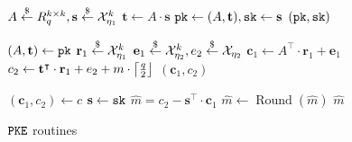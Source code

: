 \documentclass{article}
\begin{document}
\begin{figure}[H]
    \begin{minipage}{0.3\textwidth}
        \begin{algorithm}[H]
            \caption{$\keygen_\pke$}\label{alg:kyber-pke-keygen}
            \begin{algorithmic}[1]
                \State $A \stackrel{\$}{\leftarrow} R_q^{k \times k}
                    , \mathbf{s} \stackrel{\$}{\leftarrow} \mathcal{X}_{\eta_1}^k$
                \State $\mathbf{t} \leftarrow A \cdot \mathbf{s}$
                \State $\texttt{pk} \leftarrow (A, \mathbf{t}), \texttt{sk} \leftarrow \mathbf{s}$
                \State \Return $(\texttt{pk}, \texttt{sk})$
            \end{algorithmic}
        \end{algorithm}
    \end{minipage}
    \hfill
    \begin{minipage}{0.3\textwidth}
        \begin{algorithm}[H]
            \caption{$\encrypt_\pke(\pk, m)$}\label{alg:kyber-pke-encrypt}
            \begin{algorithmic}[1]
                \State $(A, \mathbf{t}) \leftarrow \texttt{pk}$
                \State $\mathbf{r}_1 \stackrel{\$}{\leftarrow} \mathcal{X}_{\eta_1}^k$
                \State $\mathbf{e}_1 \stackrel{\$}{\leftarrow} \mathcal{X}_{\eta_2}^k,
                    e_2 \stackrel{\$}{\leftarrow} \mathcal{X}_{\eta_2}$
                \State $\mathbf{c}_1 \leftarrow A^\intercal \cdot \mathbf{r}_1 + \mathbf{e}_1$
                \State $c_2 \leftarrow \mathbf{t}^\intercal \cdot \mathbf{r}_1 + e_2 + m \cdot \left\lceil{\frac{q}{2}}\right\rfloor$
                \State \Return $(\mathbf{c}_1, c_2)$
            \end{algorithmic}
        \end{algorithm}
    \end{minipage}
    \hfill
    \begin{minipage}{0.3\textwidth}
        \begin{algorithm}[H]
            \caption{$\decrypt_\pke(\sk, c)$}\label{alg:kyber-pke-decrypt}
            \begin{algorithmic}[1]
                \State $(\mathbf{c}_1, c_2) \leftarrow c$
                \State $\mathbf{s} \leftarrow \texttt{sk}$
                \State $\hat{m} = c_2 - \mathbf{s}^\intercal \cdot \mathbf{c}_1$
                \State $\hat{m} \leftarrow \operatorname{Round}(\hat{m})$
                \State \Return $\hat{m}$
            \end{algorithmic}
        \end{algorithm}
    \end{minipage}
    \caption{$\texttt{PKE}$ routines}\label{fig:kyber-pke-routines}
\end{figure}




\end{document}
